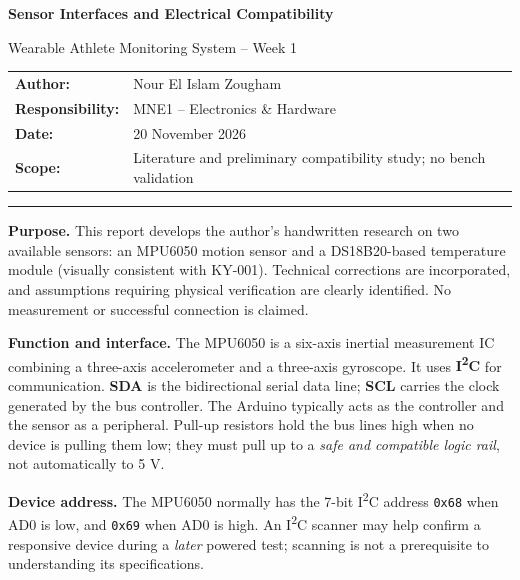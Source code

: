 \documentclass[11pt,a4paper]{article}
\newcommand{\sect}[1]{\vspace{6pt}{\color{navy}\large\bfseries #1}\par\vspace{2pt}}
\begin{document}
{\color{navy}\LARGE\bfseries Sensor Interfaces and Electrical Compatibility}\par
{\large Wearable Athlete Monitoring System -- Week 1}\par\vspace{9pt}
\begin{tabular}{@{}ll@{}}\textbf{Author:} & Nour El Islam Zougham \\
\textbf{Responsibility:} & MNE1 -- Electronics \& Hardware\\
\textbf{Date:} & 20 November 2026\\
\textbf{Scope:} & Literature and preliminary compatibility study; no bench validation\\
\end{tabular}
\vspace{4pt}\hrule\vspace{8pt}
\textbf{Purpose.} This report develops the author's handwritten research on two available sensors: an MPU6050 motion sensor and a DS18B20-based temperature module (visually consistent with KY-001). Technical corrections are incorporated, and assumptions requiring physical verification are clearly identified. No measurement or successful connection is claimed.

\sect{1. MPU6050 motion-sensing module}
\textbf{Function and interface.} The MPU6050 is a six-axis inertial measurement IC combining a three-axis accelerometer and a three-axis gyroscope. It uses \textbf{I\textsuperscript{2}C} for communication. \textbf{SDA} is the bidirectional serial data line; \textbf{SCL} carries the clock generated by the bus controller. The Arduino typically acts as the controller and the sensor as a peripheral. Pull-up resistors hold the bus lines high when no device is pulling them low; they must pull up to a \emph{safe and compatible logic rail}, not automatically to 5 V.

\textbf{Device address.} The MPU6050 normally has the 7-bit I\textsuperscript{2}C address \texttt{0x68} when AD0 is low, and \texttt{0x69} when AD0 is high. An I\textsuperscript{2}C scanner may help confirm a responsive device during a \emph{later} powered test; scanning is not a prerequisite to understanding its specifications.
\end{document}
